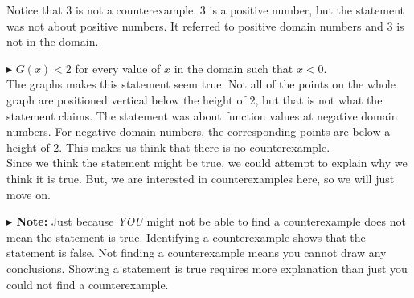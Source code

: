 \documentclass{ximera}
\begin{document}
Notice that $3$ is not a counterexample.  $3$ is a positive number, but the statement was not about positive numbers.  It referred to positive domain numbers and $3$ is not in the domain.














\textbf{\textcolor{red!70!darkgray}{$\blacktriangleright$}} $G(x) < 2$  for every value of $x$ in the domain such that $x < 0$. \\

The graphs makes this statement seem true.  Not all of the points on the whole graph are positioned vertical below the height of $2$, but that is not what the statement claims. The statement was about function values at negative domain numbers. For negative domain numbers, the corresponding points are below a height of $2$.  This makes us think that there is no counterexample.  \\

Since we think the statement might be true, we could attempt to explain why we think it is true.  But, we are interested in counterexamples here, so we will just move on.








\textbf{$\blacktriangleright$ Note:}  Just because \textit{YOU} might not be able to find a counterexample does not mean the statement is true.  Identifying a counterexample shows that the statement is false. Not finding a counterexample means you cannot draw any conclusions.  Showing a statement is true requires more explanation than just you could not find a counterexample. \\
\end{document}
